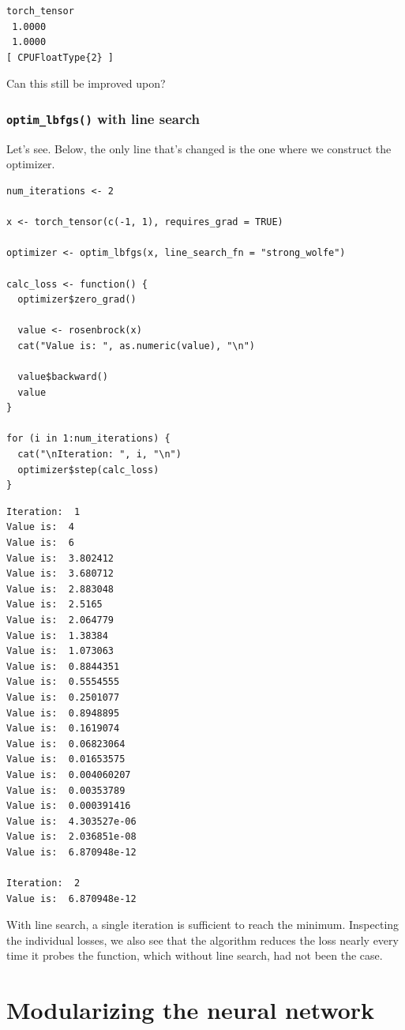 \documentclass[
  letterpaper,
]{krantz}
\begin{document}
\begin{verbatim}
torch_tensor
 1.0000
 1.0000
[ CPUFloatType{2} ]
\end{verbatim}

Can this still be improved upon?

\hypertarget{optim_lbfgs-with-line-search}{%
\subsection{\texorpdfstring{\texttt{optim\_lbfgs()} with line
search}{optim\_lbfgs() with line search}}\label{optim_lbfgs-with-line-search}}

Let's see. Below, the only line that's changed is the one where we
construct the optimizer.

\begin{verbatim}
num_iterations <- 2

x <- torch_tensor(c(-1, 1), requires_grad = TRUE)

optimizer <- optim_lbfgs(x, line_search_fn = "strong_wolfe")

calc_loss <- function() {
  optimizer$zero_grad()

  value <- rosenbrock(x)
  cat("Value is: ", as.numeric(value), "\n")

  value$backward()
  value
}

for (i in 1:num_iterations) {
  cat("\nIteration: ", i, "\n")
  optimizer$step(calc_loss)
}
\end{verbatim}

\begin{verbatim}
Iteration:  1 
Value is:  4 
Value is:  6 
Value is:  3.802412 
Value is:  3.680712 
Value is:  2.883048 
Value is:  2.5165 
Value is:  2.064779 
Value is:  1.38384 
Value is:  1.073063 
Value is:  0.8844351 
Value is:  0.5554555 
Value is:  0.2501077 
Value is:  0.8948895 
Value is:  0.1619074 
Value is:  0.06823064 
Value is:  0.01653575 
Value is:  0.004060207 
Value is:  0.00353789 
Value is:  0.000391416 
Value is:  4.303527e-06 
Value is:  2.036851e-08 
Value is:  6.870948e-12 

Iteration:  2 
Value is:  6.870948e-12 
\end{verbatim}

With line search, a single iteration is sufficient to reach the minimum.
Inspecting the individual losses, we also see that the algorithm reduces
the loss nearly every time it probes the function, which without line
search, had not been the case.

\hypertarget{sec:network-2}{%
\chapter{Modularizing the neural network}\label{sec:network-2}}
\end{document}
